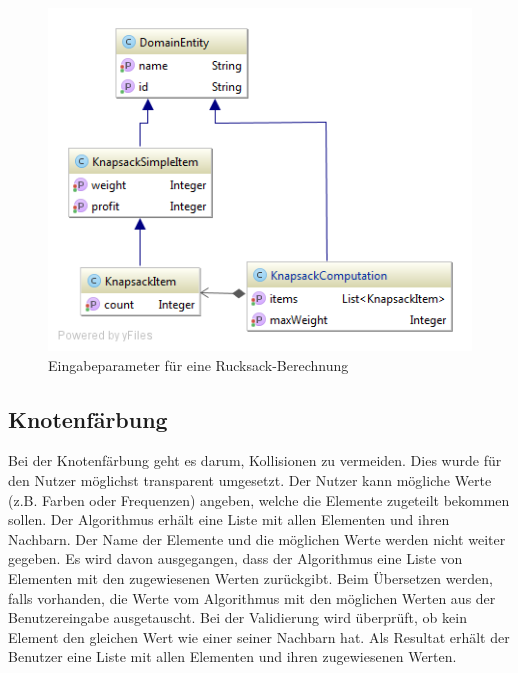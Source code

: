 \begin{figure}[h]
\centering
\includegraphics[scale=0.5]{images/probleme/knapsack.png}
\caption[Eingabeparameter für eine Rucksack-Berechnung]{Eingabeparameter für eine Rucksack-Berechnung \selfmade{}}
\label{fig:knapsack_input}
\end{figure}

\FloatBarrier

%
%
%
%

\subsection{Knotenfärbung}
Bei der Knotenfärbung geht es darum, Kollisionen zu vermeiden. Dies wurde für den Nutzer möglichst transparent umgesetzt. Der Nutzer kann mögliche Werte (z.B. Farben oder 
Frequenzen) angeben, welche die Elemente zugeteilt bekommen sollen. Der Algorithmus erhält eine Liste mit allen Elementen und ihren Nachbarn. Der Name der Elemente und die möglichen 
Werte werden nicht weiter gegeben. Es wird davon ausgegangen, dass der Algorithmus eine Liste von Elementen mit den zugewiesenen Werten zurückgibt. Beim Übersetzen werden, falls 
vorhanden, die Werte vom Algorithmus mit den möglichen Werten aus der Benutzereingabe ausgetauscht. Bei der Validierung wird überprüft, ob kein Element den gleichen Wert wie einer 
seiner Nachbarn hat. Als Resultat erhält der Benutzer eine Liste mit allen Elementen und ihren zugewiesenen Werten.

